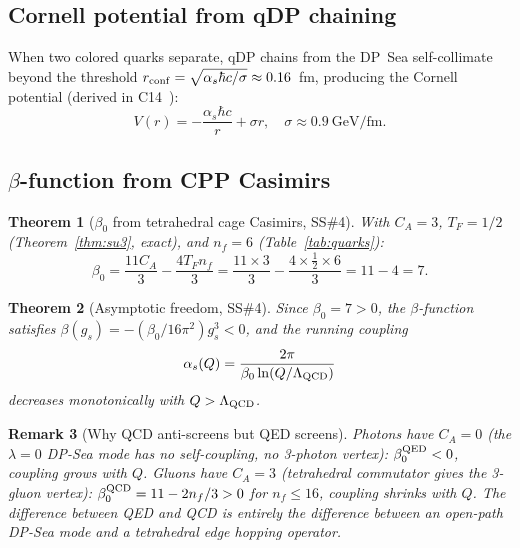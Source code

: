 \documentclass[11pt,a4paper]{article}
\newtheorem{theorem}{Theorem}[section]
\newtheorem{remark}[theorem]{Remark}
\newcommand{\as}{\alpha_s}
\begin{document}
\subsection{Cornell potential from qDP chaining}

When two colored quarks separate, qDP chains from the DP~Sea
self-collimate beyond the threshold $r_{\rm conf} =
\sqrt{\as\hbar c/\sigma} \approx 0.16$~fm, producing the Cornell
potential (derived in C14~\citep{c14}):
\begin{equation}
V(r) = -\frac{\as\hbar c}{r} + \sigma r,\quad
\sigma \approx 0.9\ \text{GeV/fm}.
\label{eq:cornell}
\end{equation}

\subsection{$\beta$-function from CPP Casimirs}

\begin{theorem}[$\beta_0$ from tetrahedral cage Casimirs, SS\#4]
\label{thm:beta0}
With $C_A = 3$, $T_F = 1/2$ (Theorem~\ref{thm:su3}, exact), and
$n_f = 6$ (Table~\ref{tab:quarks}):
\begin{equation}
\beta_0 = \frac{11C_A}{3} - \frac{4T_F n_f}{3}
= \frac{11\times3}{3} - \frac{4\times\tfrac{1}{2}\times6}{3}
= 11 - 4 = 7.
\label{eq:beta0}
\end{equation}
\end{theorem}

\begin{theorem}[Asymptotic freedom, SS\#4]
\label{thm:af}
Since $\beta_0 = 7 > 0$, the $\beta$-function satisfies
$\beta(g_s) = -(\beta_0/16\pi^2)g_s^3 < 0$, and the running
coupling
\begin{equation}
\as(Q) = \frac{2\pi}{\beta_0\ln(Q/\Lambda_{\rm QCD})}
\label{eq:running}
\end{equation}
decreases monotonically with $Q > \Lambda_{\rm QCD}$.
\end{theorem}

\begin{remark}[Why QCD anti-screens but QED screens]
Photons have $C_A = 0$ (the $\lambda=0$ DP-Sea mode has no
self-coupling, no 3-photon vertex): $\beta_0^{\rm QED} < 0$,
coupling grows with $Q$.  Gluons have $C_A = 3$ (tetrahedral
commutator gives the 3-gluon vertex): $\beta_0^{\rm QCD} = 11 -
2n_f/3 > 0$ for $n_f \leq 16$, coupling shrinks with $Q$.  The
difference between QED and QCD is entirely the difference between
an open-path DP-Sea mode and a tetrahedral edge hopping operator.
\end{remark}
\end{document}
